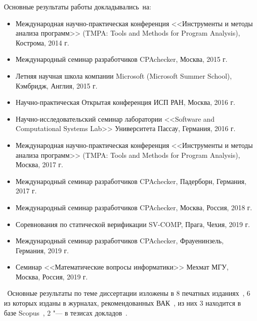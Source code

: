 
{\probation}
Основные результаты работы докладывались~на:
\begin{itemize}
  \item Международная научно-практическая конференция <<Инструменты и методы анализа программ>> (TMPA: Tools and Methods for Program Analysis), Кострома, 2014 г.
  \item Международный семинар разработчиков CPAchecker, Москва, 2015 г.
  \item Летняя научная школа компании Microsoft (Microsoft Summer School), Кэмбридж, Англия, 2015 г.
  \item Научно-практическая Открытая конференция ИСП РАН, Москва, 2016 г.
  \item Научно-исследовательский семинар лаборатории <<Software and Computational Systems Lab>> Университета Пассау, Германия, 2016 г.
  \item Международная научно-практическая конференция <<Инструменты и методы анализа программ>> (TMPA: Tools and Methods for Program Analysis), Москва, 2017 г.
  \item Международный семинар разработчиков CPAchecker, Падерборн, Германия, 2017 г.
  \item Международный семинар разработчиков CPAchecker, Москва, Россия, 2018 г.
  \item Соревнования по статической верификации SV-COMP, Прага, Чехия, 2019 г.
  \item Международный семинар разработчиков CPAchecker, Фрауенинзель, Германия, 2019 г.
  \item Семинар <<Математические вопросы информатики>> Мехмат МГУ, Москва, Россия, 2019 г.
\end{itemize}

\publications\ Основные результаты по теме диссертации изложены в 8 печатных изданиях~\cite{theoryVAK,KernelRaces,LockatorScalable,lockatorVAK,lockatorVAK2,TMPA2017,lockatorSyrcose,lockatorTMPA}, 
    6 из которых изданы в журналах, рекомендованных ВАК~\cite{theoryVAK,lockatorVAK,lockatorVAK2,KernelRaces,LockatorScalable,TMPA2017}, из них 3 находится в базе Scopus~\cite{KernelRaces,LockatorScalable,TMPA2017},
    2 "--- в тезисах докладов~\cite{lockatorSyrcose,lockatorTMPA}.

